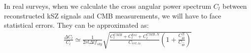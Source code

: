 In real surveys, when we calculate the cross angular power spectrum $C_l$ between reconstructed kSZ signals and CMB measurements, we will have to face statistical errors. 
They can be approximated as:
\begin{eqnarray}
\frac{\Delta C_l}{C_l}\simeq \frac{1}{2 r l \Delta l f_{sky}}\sqrt{\frac{C_l^{CMB}+C_l^{ksz}+C_l^{CMB,N}}{C_^{kSZ,\Delta z}}(1+\frac{C^N_{\hat \Theta}}{C_{\hat \Theta}})}\,
\end{eqnarray}

